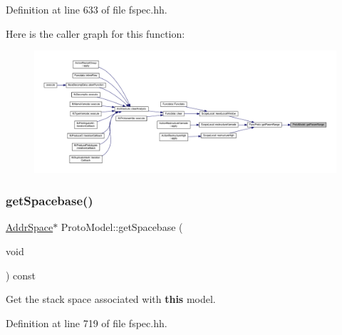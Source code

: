 Definition at line 633 of file fspec.\+hh.

Here is the caller graph for this function\+:
\nopagebreak
\begin{figure}[H]
\begin{center}
\leavevmode
\includegraphics[width=350pt]{class_proto_model_a2a83c006b588fad0b0842c6f9862e66b_icgraph}
\end{center}
\end{figure}
\mbox{\label{class_proto_model_a9918d9e7595d9f33f53bd9ffd3118f19}} 
\subsubsection{\texorpdfstring{getSpacebase()}{getSpacebase()}}
{\footnotesize\ttfamily \mbox{\hyperlink{class_addr_space}{Addr\+Space}}$\ast$ Proto\+Model\+::get\+Spacebase (\begin{DoxyParamCaption}\item[{void}]{ }\end{DoxyParamCaption}) const\hspace{0.3cm}{\ttfamily [inline]}}



Get the stack space associated with {\bfseries{this}} model. 



Definition at line 719 of file fspec.\+hh.

